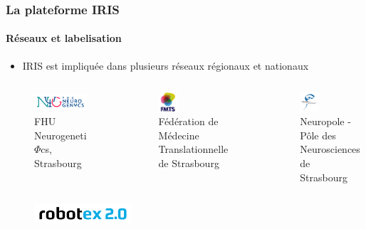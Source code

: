 \begin{frame}
    \frametitle{La plateforme IRIS}
    \framesubtitle{Réseaux et labelisation}
    \begin{itemize}
        \item IRIS est impliquée dans plusieurs réseaux régionaux et nationaux
    \end{itemize}
    \begin{columns}
        \begin{figure}[!h]
            \centering
                \includegraphics[height=0.7cm]{logos/reseaux_labelisation/nyg_nouleur-2.png}
                \caption*{FHU Neurogeneti$\Phi$cs, Strasbourg}
        \end{figure}  
        \begin{figure}[!h]
            \centering
                \includegraphics[height=0.7cm]{logos/reseaux_labelisation/logo_FMTS.jpg}
                \caption*{Fédération de Médecine Translationnelle de Strasbourg}
        \end{figure}  
        \begin{figure}[!h]
            \centering
                \includegraphics[height=0.7cm]{logos/reseaux_labelisation/neuropole_photo_large.jpg}
                \caption*{Neuropole - Pôle des Neurosciences de Strasbourg}
        \end{figure}              
    \end{columns}
    \begin{columns}
            \begin{figure}[!h]
                \centering
                    \includegraphics[height=0.7cm]{logos/reseaux_labelisation/ROBOTEX2.0-V1.png}
            \end{figure} 

\end{columns}
\end{frame}
